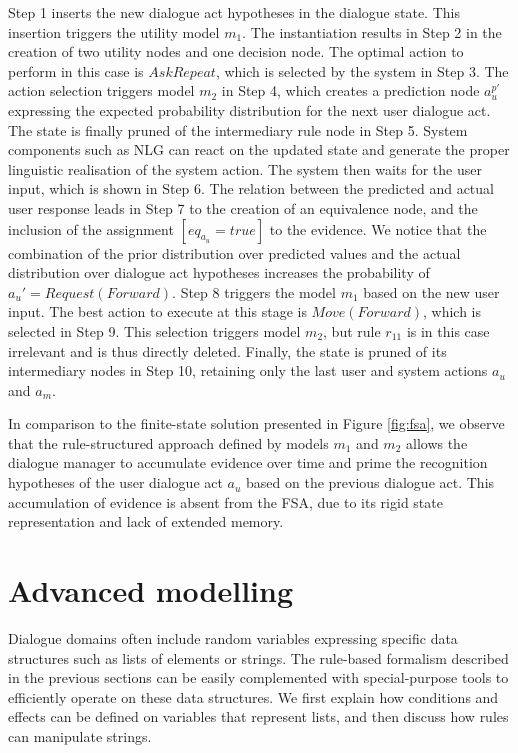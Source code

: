 Step 1 inserts the new dialogue act hypotheses in the dialogue state.  This insertion triggers 
the utility model $m_1$. The instantiation results in Step 2 in the creation of two utility nodes and one decision node.  The optimal action to perform in this case is $\mathit{AskRepeat}$, which is selected by the system in Step 3. The action selection triggers model $m_2$ in Step 4, which creates a prediction node $a_{u}^{p\prime}$ expressing the expected probability distribution for the next user dialogue act. The state is finally pruned of the intermediary rule node in Step 5.  System components such as NLG can react on the updated state and generate the proper linguistic realisation of the system action. The system then waits for the user input, which is shown in Step 6.  The relation between the predicted and actual user response leads in Step 7 to the creation of an equivalence node, and the inclusion of the assignment $[\mathit{eq}_{a_u}\!=\!true]$ to the evidence. We notice that the combination of the prior distribution over predicted values and the actual distribution over dialogue act hypotheses increases the probability of $a_u' = \mathit{Request(Forward)}$. Step 8 triggers the model $m_1$ based on the new user input.  The best action to execute at this stage is $\mathit{Move(Forward)}$, which is selected in Step 9.  This selection triggers model $m_2$, but rule $r_{11}$ is in this case irrelevant and is thus directly deleted. Finally, the state is pruned of its intermediary nodes in Step 10, retaining only the last user and system actions $a_u$ and $a_m$. 

In comparison to the finite-state solution presented in Figure \ref{fig:fsa}, we observe that the rule-structured approach defined by models $m_1$ and $m_2$ allows the dialogue manager to accumulate evidence over time and prime the recognition hypotheses of the user dialogue act $a_u$ based on the previous dialogue act.  This accumulation of evidence is absent from the FSA, due to its rigid state representation and lack of extended memory. 

\section{Advanced modelling}
\label{sec:amodelling}

Dialogue domains often include random variables expressing specific data structures such as lists of elements or strings. The rule-based formalism described in the previous sections can be easily complemented with special-purpose tools to efficiently operate on these data structures. We first explain how conditions and effects can be defined on variables that represent lists, and then discuss how rules can manipulate strings. 

